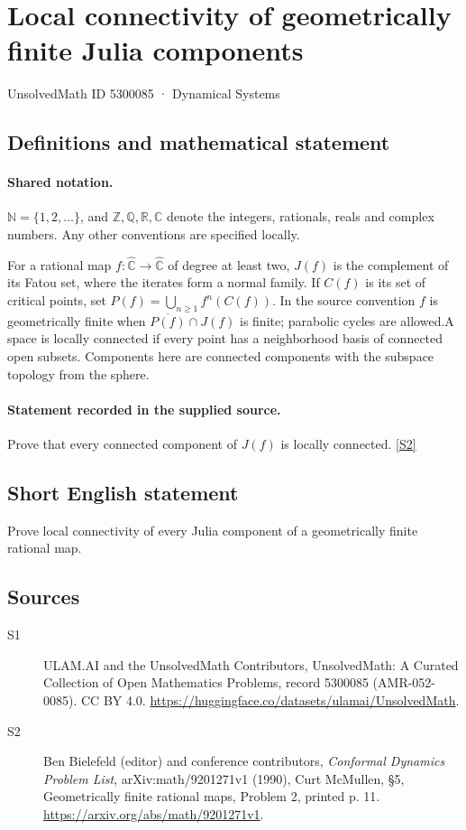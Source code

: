 \documentclass[11pt]{article}
\newcommand{\sref}[2]{\hyperlink{source:#1:#2}{[S#2]}}
\begin{document}
\setcounter{section}{5300084}
\section{Local connectivity of geometrically finite Julia components}\label{5300085}
{\small\sffamily UnsolvedMath ID 5300085 · Dynamical Systems}
\subsection{Definitions and mathematical statement}

\paragraph{Shared notation.}$\mathbb N=\{1,2,\ldots\}$, and $\mathbb Z,\mathbb Q,\mathbb R,\mathbb C$ denote the integers, rationals, reals and complex numbers. Any other conventions are specified locally.


For a rational map $f:\widehat{\mathbb C}\to\widehat{\mathbb C}$ of degree at least two, $J(f)$ is the complement of its Fatou set, where the iterates form a normal family. If $C(f)$ is its set of critical points, set $P(f)=\bigcup_{n\geq1}f^n(C(f))$. In the source convention $f$ is geometrically finite when $\overline{P(f)}\cap J(f)$ is finite; parabolic cycles are allowed.A space is locally connected if every point has a neighborhood basis of connected open subsets. Components here are connected components with the subspace topology from the sphere.
\paragraph{Statement recorded in the supplied source.}
Prove that every connected component of $J(f)$ is locally connected. \sref{5300085}{2}
\subsection{Short English statement}
Prove local connectivity of every Julia component of a geometrically finite rational map.
\subsection{Sources}
\begin{description}
\item[\hypertarget{source:5300085:1}{S1}] ULAM.AI and the UnsolvedMath Contributors, UnsolvedMath: A Curated Collection of Open Mathematics Problems, record 5300085 (AMR-052-0085). CC BY 4.0. \url{https://huggingface.co/datasets/ulamai/UnsolvedMath}.
\item[\hypertarget{source:5300085:2}{S2}] Ben Bielefeld (editor) and conference contributors, \emph{Conformal Dynamics Problem List}, arXiv:math/9201271v1 (1990), Curt McMullen, \S5, Geometrically finite rational maps, Problem 2, printed p. 11. \url{https://arxiv.org/abs/math/9201271v1}.
\end{description}
\label{end:5300085}
\end{document}
